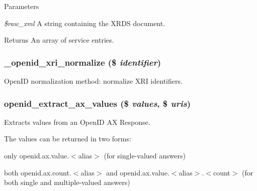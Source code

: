 \begin{DoxyParams}{Parameters}
\item[{\em \$raw\_\-xml}]A string containing the XRDS document. \end{DoxyParams}
\begin{DoxyReturn}{Returns}
An array of service entries. 
\end{DoxyReturn}
\hypertarget{openid_8inc_adef3bc56b5a4c57ce996187cffb16492}{
\subsubsection[{\_\-openid\_\-xri\_\-normalize}]{\setlength{\rightskip}{0pt plus 5cm}\_\-openid\_\-xri\_\-normalize (\$ {\em identifier})}}
\label{openid_8inc_adef3bc56b5a4c57ce996187cffb16492}
OpenID normalization method: normalize XRI identifiers. \hypertarget{openid_8inc_adf7dfa87340980c5bf7e4cd11e717da3}{
\subsubsection[{openid\_\-extract\_\-ax\_\-values}]{\setlength{\rightskip}{0pt plus 5cm}openid\_\-extract\_\-ax\_\-values (\$ {\em values}, \/  \$ {\em uris})}}
\label{openid_8inc_adf7dfa87340980c5bf7e4cd11e717da3}
Extracts values from an OpenID AX Response.

The values can be returned in two forms:
\begin{DoxyItemize}
\item only openid.ax.value.$<$alias$>$ (for single-\/valued answers)
\item both openid.ax.count.$<$alias$>$ and openid.ax.value.$<$alias$>$.$<$count$>$ (for both single and multiple-\/valued answers)
\end{DoxyItemize}


